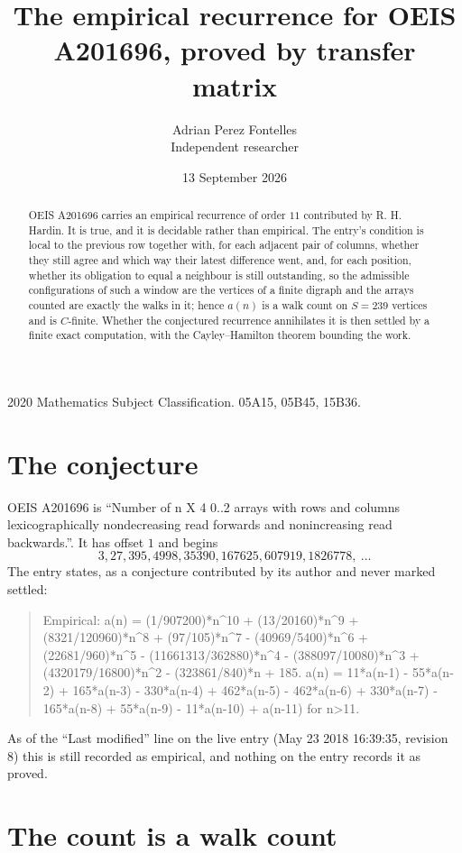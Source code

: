 \documentclass[11pt,a4paper]{article}
\title{The empirical recurrence for OEIS A201696, proved by transfer matrix}
\author{Adrian Perez Fontelles\\ \small Independent researcher}
\date{13 September 2026}
\theoremstyle{plain}
\theoremstyle{definition}
\begin{document}
\maketitle

\begin{abstract}
OEIS A201696 carries an empirical recurrence of order $11$ contributed by R. H. Hardin. It is
true, and it is decidable rather than empirical. The entry's condition is local to the previous row together with, for each adjacent pair of columns, whether they still agree and which way their latest difference went, and, for each position, whether its obligation to equal a neighbour is still outstanding, so
the admissible configurations of such a window are the vertices of a finite digraph and the
arrays counted are exactly the walks in it; hence $a(n)$ is a walk count on $S=239$ vertices
and is $C$-finite. Whether the conjectured recurrence annihilates it is then settled by a
finite exact computation, with the Cayley--Hamilton theorem bounding the work.
\end{abstract}

\noindent\small 2020 Mathematics Subject Classification. 05A15, 05B45, 15B36.\normalsize

\section{The conjecture}

OEIS A201696 is ``Number of n X 4 0..2 arrays with rows and columns lexicographically nondecreasing read forwards and nonincreasing read backwards.''. It has offset $1$ and begins
\[
3, 27, 395, 4998, 35390, 167625, 607919, 1826778,\ \dots
\]
The entry states, as a conjecture contributed by its author and never marked settled:
\begin{quote}
Empirical: a(n) = (1/907200)*n\^{}10 + (13/20160)*n\^{}9 + (8321/120960)*n\^{}8 + (97/105)*n\^{}7 - (40969/5400)*n\^{}6 + (22681/960)*n\^{}5 - (11661313/362880)*n\^{}4 - (388097/10080)*n\^{}3 + (4320179/16800)*n\^{}2 - (323861/840)*n + 185. a(n) = 11*a(n-1) - 55*a(n-2) + 165*a(n-3) - 330*a(n-4) + 462*a(n-5) - 462*a(n-6) + 330*a(n-7) - 165*a(n-8) + 55*a(n-9) - 11*a(n-10) + a(n-11) for n>11.
\end{quote}
As of the ``Last modified'' line on the live entry (May 23 2018 16:39:35, revision 8) this is still
recorded as empirical, and nothing on the entry records it as proved.

\section{The count is a walk count}
\end{document}
